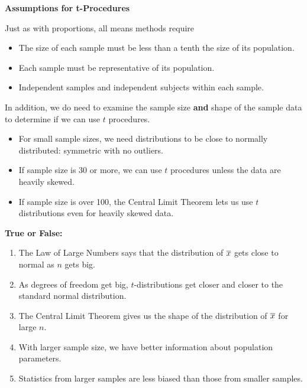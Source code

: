

\begin{center}
  {\large\bf Assumptions for t-Procedures}
\end{center}

  Just as with proportions, all means methods require 
  \begin{itemize}
     \item The size of each sample must be less than a tenth the size
       of its population.
     \item Each sample must be representative of its population. 
     \item Independent samples and independent subjects within each
       sample.
  \end{itemize}
   In addition, we do need to examine the sample size {\bf and} shape
   of the sample data to determine if we can use $t$ procedures.
   \begin{itemize}
   \item For small sample sizes, we need distributions to be close to
     normally distributed: symmetric with no outliers.
   \item If sample size is 30 or more, we can use $t$ procedures
     unless the data are heavily skewed.
   \item If sample size is over 100, the Central Limit Theorem lets us
     use $t$ distributions even for heavily skewed data.
   \end{itemize}

   \begin{center}
     {\large\bf True or False:}
   \end{center}
   \begin{enumerate}
   \item \underline{\hspace{.5in}} The Law of Large Numbers says that the
     distribution of $\overline{x}$  gets close to normal as $n$ gets big. 
   \item \underline{\hspace{.5in}} As degrees of freedom get big,
     $t$-distributions get 
     closer and closer to the standard normal distribution.
   \item \underline{\hspace{.5in}} The Central Limit Theorem gives us the shape of
     the distribution of $\overline{x}$ for large $n$.
   \item \underline{\hspace{.5in}}  With larger sample size, we have better
     information about population parameters.
   \item \underline{\hspace{.5in}} Statistics from larger samples are less biased
     than those from smaller samples.
   \end{enumerate}

